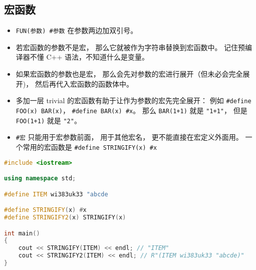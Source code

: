 \subsection{宏函数}
\begin{itemize}
\item \verb|FUN(参数) #参数| 在参数两边加双引号。
\item 若宏函数的参数不是宏， 那么它就被作为字符串替换到宏函数中。 记住预编译器不懂 C++ 语法，不知道什么是变量。
\item 如果宏函数的参数也是宏， 那么会先对参数的宏进行展开（但未必会完全展开)， 然后再代入宏函数的函数体中。
\item 多加一层 trivial 的宏函数有助于让作为参数的宏先完全展开： 例如 \verb|#define FOO(x) BAR(x)|， \verb|#define BAR(x) #x|。 那么 \verb|BAR(1+1)| 就是 \verb|"1+1"|， 但是 \verb|FOO(1+1)| 就是 \verb|"2"|。
\item \verb|#宏| 只能用于宏参数前面， 用于其他宏名， 更不能直接在宏定义外面用。 一个常用的宏函数是 \verb|#define STRINGIFY(x) #x|
\end{itemize}

\begin{lstlisting}[language=cpp]
#include <iostream>

using namespace std;

#define ITEM wi383uk33 "abcde

#define STRINGIFY(x) #x
#define STRINGIFY2(x) STRINGIFY(x)

int main()
{
	cout << STRINGIFY(ITEM) << endl; // "ITEM"
	cout << STRINGIFY2(ITEM) << endl; // R"(ITEM wi383uk33 "abcde)"
}
\end{lstlisting}
